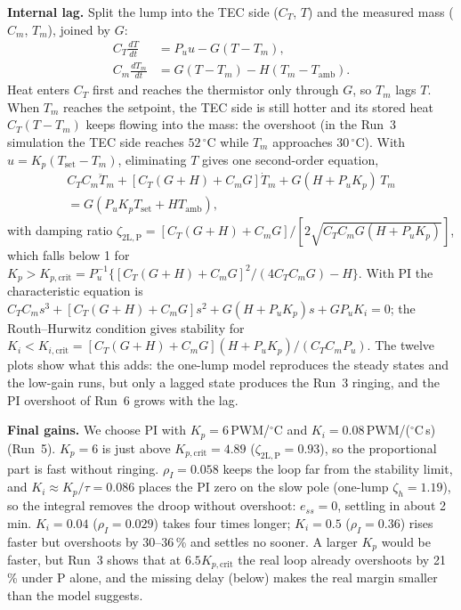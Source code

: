 \documentclass[reprint, amsmath, amssymb, aps, floatfix]{revtex4-2}
\newcommand{\degC}{\,^\circ\mathrm{C}}
\newcommand{\Tset}{T_{\mathrm{set}}}
\newcommand{\Tamb}{T_{\mathrm{amb}}}
\newcommand{\zP}{\zeta_{\mathrm{2L,P}}}
\newcommand{\Kpc}{K_{p,\mathrm{crit}}}
\newcommand{\Kic}{K_{i,\mathrm{crit}}}
\begin{document}
\textbf{Internal lag.} Split the lump into the TEC side ($C_T$, $T$) and the measured mass
($C_m$, $T_m$), joined by $G$:
\begin{align}
C_T\frac{dT}{dt} &= P_uu - G(T - T_m),\\
C_m\frac{dT_m}{dt} &= G(T - T_m) - H(T_m - \Tamb).
\end{align}
Heat enters $C_T$ first and reaches the thermistor only through $G$, so $T_m$ lags $T$.
When $T_m$ reaches the setpoint, the TEC side is still hotter and its stored heat
$C_T(T - T_m)$ keeps flowing into the mass: the overshoot (in the Run~3 simulation the TEC
side reaches $52\degC$ while $T_m$ approaches $30\degC$). With $u = K_p(\Tset - T_m)$,
eliminating $T$ gives one second-order equation,
\begin{multline}
C_TC_m\ddot T_m + [C_T(G+H) + C_mG]\dot T_m + G(H + P_uK_p)\,T_m \\
= G(P_uK_p\Tset + H\Tamb),
\end{multline}
with damping ratio
$\zP = [C_T(G+H) + C_mG]/[2\sqrt{C_TC_mG(H + P_uK_p)}]$, which falls below 1 for
$K_p > \Kpc = P_u^{-1}\{[C_T(G+H) + C_mG]^2/(4C_TC_mG) - H\}$. With PI the characteristic
equation is
$C_TC_ms^3 + [C_T(G+H) + C_mG]s^2 + G(H + P_uK_p)s + GP_uK_i = 0$; the Routh--Hurwitz
condition gives stability for
$K_i < \Kic = [C_T(G+H) + C_mG](H + P_uK_p)/(C_TC_mP_u)$. The twelve plots show what this
adds: the one-lump model reproduces the steady states and the low-gain runs, but only a
lagged state produces the Run~3 ringing, and the PI overshoot of Run~6 grows with the lag.

\textbf{Final gains.} We choose PI with $K_p = 6$\,PWM/$^\circ$C and
$K_i = 0.08$\,PWM/($^\circ$C\,s) (Run~5). $K_p = 6$ is just above $\Kpc = 4.89$
($\zP = 0.93$), so the proportional part is fast without ringing. $\rho_I = 0.058$ keeps the
loop far from the stability limit, and $K_i \approx K_p/\tau = 0.086$ places the PI zero on the
slow pole (one-lump $\zeta_h = 1.19$), so the integral removes the droop without
overshoot: $e_{ss} = 0$, settling in about 2\,min. $K_i = 0.04$ ($\rho_I = 0.029$) takes four
times longer; $K_i = 0.5$ ($\rho_I = 0.36$) rises faster but overshoots by 30--36\,\% and
settles no sooner. A larger $K_p$ would be faster, but Run~3 shows that at $6.5\Kpc$ the
real loop already overshoots by 21\,\% under P alone, and the missing delay (below) makes the
real margin smaller than the model suggests.
\end{document}
